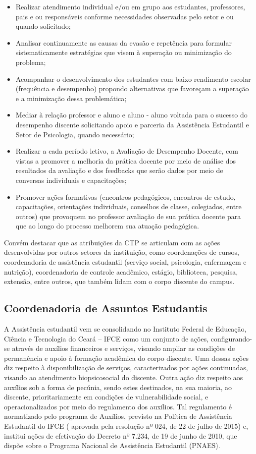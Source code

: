 \begin{itemize}
	\item Realizar atendimento individual e/ou em grupo aos estudantes, professores, pais e ou responsáveis conforme necessidades observadas pelo setor e ou quando solicitado;
	\item Analisar continuamente as causas da evasão e repetência para formular sistematicamente estratégias que visem à superação ou minimização do problema;
	\item Acompanhar o desenvolvimento dos estudantes com baixo rendimento escolar (frequência e desempenho) propondo alternativas que favoreçam a superação e a minimização dessa problemática;
	\item Mediar à relação professor e aluno e aluno - aluno voltada para o sucesso do desempenho discente solicitando apoio e parceria da Assistência Estudantil e Setor de Psicologia, quando necessário;
	\item Realizar a cada período letivo, a Avaliação de Desempenho Docente, com vistas a promover a melhoria da prática docente por meio de análise dos resultados da avaliação e dos feedbacks que serão dados por meio de conversas individuais e capacitações;
	\item Promover ações formativas (encontros pedagógicos, encontros de estudo, capacitações, orientações individuais, conselhos de classe, colegiados, entre outros) que provoquem no professor avaliação de sua prática docente para que ao longo do processo melhorem sua atuação pedagógica.
\end{itemize}

Convém destacar que as atribuições da CTP se articulam com as ações desenvolvidas por outros setores da instituição, como coordenações de cursos, coordenadoria de assistência estudantil (serviço social, psicologia, enfermagem e nutrição), coordenadoria de controle acadêmico, estágio, biblioteca, pesquisa, extensão, entre outros, que também lidam com o corpo discente do campus.

\subsection{Coordenadoria de Assuntos Estudantis}

A Assistência estudantil vem se consolidando no Instituto Federal de Educação, Ciência e Tecnologia do Ceará – IFCE como um conjunto de ações, configurando-se através de auxílios financeiros e serviços, visando ampliar as condições de permanência e apoio à formação acadêmica do corpo discente. Uma dessas ações diz respeito à disponibilização de serviços, caracterizados por ações continuadas, visando ao atendimento biopsicosocial do discente. Outra ação diz respeito aos auxílios sob a forma de pecúnia, sendo estes destinados, na sua maioria, ao discente, prioritariamente em condições de vulnerabilidade social, e operacionalizados por meio do regulamento dos auxílios. Tal regulamento é normatizado pelo programa de Auxílios, previsto na Política de Assistência Estudantil do IFCE ( aprovada pela resolução nº 024, de 22 de julho de 2015) e, institui ações de efetivação do Decreto nº 7.234, de 19 de junho de 2010, que dispõe sobre o Programa Nacional de Assistência Estudantil (PNAES).

